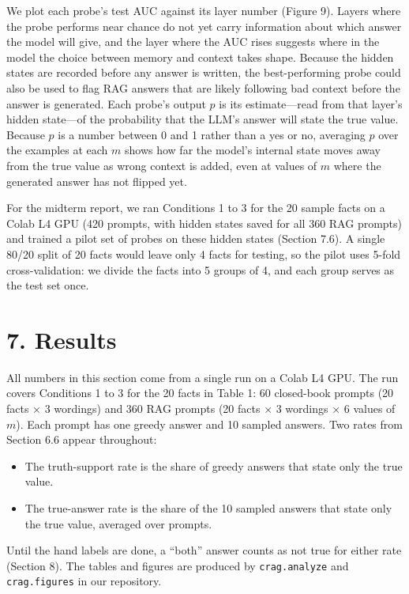 \documentclass[
  12pt,
  letterpaper,
]{article}
\providecommand{\tightlist}{%
  \setlength{\itemsep}{0pt}\setlength{\parskip}{0pt}}
\begin{document}
We plot each probe's test AUC against its layer
number (Figure 9). Layers where the probe performs
near chance do not yet carry information about
which answer the model will give, and the layer
where the AUC rises suggests where in the model
the choice between memory and context takes shape.
Because the hidden states are recorded before any
answer is written, the best-performing probe could
also be used to flag RAG answers that are likely
following bad context before the answer is
generated. Each probe's output \(p\) is its
estimate---read from that layer's hidden
state---of the probability that the LLM's answer
will state the true value. Because \(p\) is a
number between 0 and 1 rather than a yes or no,
averaging \(p\) over the examples at each \(m\)
shows how far the model's internal state moves
away from the true value as wrong context is
added, even at values of \(m\) where the generated
answer has not flipped yet.

For the midterm report, we ran Conditions 1 to 3
for the 20 sample facts on a Colab L4 GPU (420
prompts, with hidden states saved for all 360 RAG
prompts) and trained a pilot set of probes on
these hidden states (Section 7.6). A single 80/20
split of 20 facts would leave only 4 facts for
testing, so the pilot uses 5-fold
cross-validation: we divide the facts into 5
groups of 4, and each group serves as the test set
once.

\section{7. Results}\label{results}

All numbers in this section come from a single run
on a Colab L4 GPU. The run covers Conditions 1 to
3 for the 20 facts in Table 1: 60 closed-book
prompts (20 facts × 3 wordings) and 360 RAG
prompts (20 facts × 3 wordings × 6 values of
\(m\)). Each prompt has one greedy answer and 10
sampled answers. Two rates from Section 6.6 appear
throughout:

\begin{itemize}
\tightlist
\item
  The truth-support rate is the share of greedy
  answers that state only the true value.
\item
  The true-answer rate is the share of the 10
  sampled answers that state only the true value,
  averaged over prompts.
\end{itemize}

Until the hand labels are done, a ``both'' answer
counts as not true for either rate (Section 8).
The tables and figures are produced by
\texttt{crag.analyze} and \texttt{crag.figures} in
our repository.
\end{document}

